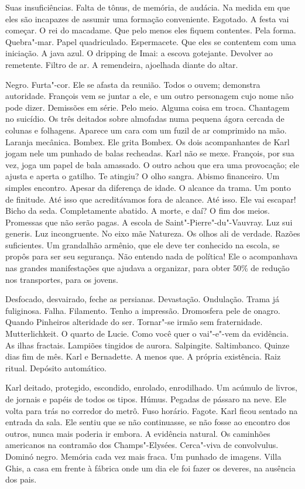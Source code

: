 Suas insuficiências. Falta de tônus, de memória, de audácia. Na medida
em que eles são incapazes de assumir uma formação conveniente. Esgotado.
A festa vai começar. O rei do macadame. Que pelo menos eles fiquem
contentes. Pela forma. Quebra"-mar. Papel quadriculado. Espermacete. Que
eles se contentem com uma iniciação. A java azul. O dripping de Imai: a
escova gotejante. Devolver ao remetente. Filtro de ar. A remendeira,
ajoelhada diante do altar.

Negro. Furta"-cor. Ele se afasta da reunião. Todos o ouvem; demonstra
autoridade. François vem se juntar a ele, e um outro personagem cujo
nome não pode dizer. Demissões em série. Pelo meio. Alguma coisa em
troca. Chantagem no suicídio. Os três deitados sobre almofadas numa
pequena ágora cercada de colunas e folhagens. Aparece um cara com um
fuzil de ar comprimido na mão. Laranja mecânica. Bombex. Ele grita
Bombex. Os dois acompanhantes de Karl jogam nele um punhado de balas
recheadas. Karl não se mexe. François, por sua vez, joga um papel de
bala amassado. O outro achou que era uma provocação; ele ajusta e aperta
o gatilho. Te atingiu? O olho sangra. Abismo financeiro. Um simples
encontro. Apesar da diferença de idade. O alcance da trama. Um ponto de
finitude. Até isso que acreditávamos fora de alcance. Até isso. Ele vai
escapar! Bicho da seda. Completamente abatido. A morte, e daí? O fim dos
meios. Promessas que não serão pagas. A escola de
Saint"-Pierre"-du"-Vauvray. Luz sui generis. Luz incongruente. No eixo mãe
Natureza. Os olhos ali de verdade. Razões suficientes. Um grandalhão
armênio, que ele deve ter conhecido na escola, se propôs para ser seu
segurança. Não entendo nada de política! Ele o acompanhava nas grandes
manifestações que ajudava a organizar, para obter 50\% de redução nos
transportes, para os jovens.

Desfocado, desvairado, feche as persianas. Devastação. Ondulação. Trama
já fuliginosa. Falha. Filamento. Tenho a impressão. Dromosfera pele de
onagro. Quando Pinheiros alteridade do ser. Tornar"-se irmão sem
fraternidade. Mutterlichkeit. O quarto de Lucie. Como você quer o
vai"-e"-vem da evidência. As ilhas fractais. Lampiões tingidos de aurora.
Salpingite. Saltimbanco. Quinze dias fim de mês. Karl e Bernadette. A
menos que. A própria existência. Raiz ritual. Depósito automático.

Karl deitado, protegido, escondido, enrolado, enrodilhado. Um acúmulo de
livros, de jornais e papéis de todos os tipos. Húmus. Pegadas de pássaro
na neve. Ele volta para trás no corredor do metrô. Fuso horário. Fagote.
Karl ficou sentado na entrada da sala. Ele sentiu que se não
continuasse, se não fosse ao encontro dos outros, nunca mais poderia ir
embora. A evidência natural. Os caminhões americanos na contramão dos
Champs"-Elysées. Cerca"-viva de convolvulus. Dominó negro. Memória cada
vez mais fraca. Um punhado de imagens. Villa Ghis, a casa em frente à
fábrica onde um dia ele foi fazer os deveres, na ausência dos pais.

